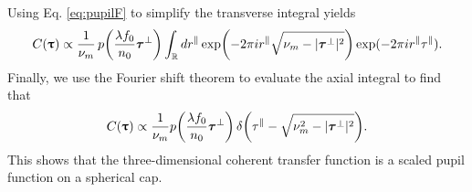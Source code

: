 \documentclass[]{osa-article}
\let\originalleft\left
\let\originalright\right
\renewcommand{\left}{\mathopen{}\mathclose\bgroup\originalleft}
\renewcommand{\right}{\aftergroup\egroup\originalright}
\newcommand{\mypar}{\parallel}
\providecommand{\mbb}[1]{\mathbb{#1}}
\providecommand{\bs}[1]{\boldsymbol{#1}}
\providecommand{\bt}{\bs{\uptau}}
\providecommand{\btperp}{\bs{\tau}^{\bot}}
\providecommand{\btpar}{\tau^{\mypar}}
\begin{document}
Using Eq. \eqref{eq:pupilF} to simplify the transverse integral yields
\begin{align}
  C(\bt) \propto \frac{1}{\nu_m}\, p\left(\frac{\lambda f_0}{n_0}\btperp\right) \int_{\mbb{R}}d r^{\mypar} \,\text{exp}\left(-2\pi i r^{\mypar}\sqrt{\nu_m - |\btperp|^2}\right)\,\text{exp}(-2\pi i r^{\mypar}\btpar).
\end{align}
Finally, we use the Fourier shift theorem to evaluate the axial integral to find that 
\begin{align}
  C(\bt) \propto \frac{1}{\nu_m}p\left(\frac{\lambda f_0}{n_0}\btperp\right)\,\delta\left(\btpar - \sqrt{\nu_m^2 - |\btperp|^2}\right).
\end{align}
This shows that the three-dimensional coherent transfer function is a scaled pupil function on a spherical cap. 




\end{document}
